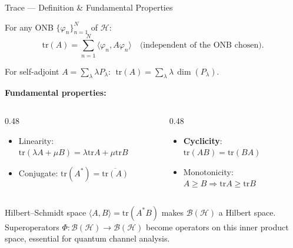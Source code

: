 \documentclass{beamer}
\newcommand{\Hilb}{\mathcal{H}}
\newcommand{\Bound}{\mathcal{B}}
\newcommand{\tr}{\mathrm{tr}}
\newcommand{\ip}[2]{\langle #1, #2 \rangle}
\begin{document}
\begin{frame}[shrink=10]{Trace --- Definition \& Fundamental Properties}
  \small
  \begin{tcolorbox}[defbox, title={Definition}, left=3pt, right=3pt, top=2pt, bottom=2pt]
    For any ONB $\{\varphi_n\}_{n=1}^N$ of $\Hilb$:
    \[
      \tr(A) = \sum_{n=1}^N \ip{\varphi_n}{A\varphi_n}
      \quad \text{(independent of the ONB chosen).}
    \]
  \end{tcolorbox}

  For self-adjoint $A=\sum_\lambda\lambda P_\lambda$:
  $\;\tr(A)=\sum_\lambda\lambda\,\dim(P_\lambda)$.

  \vspace{0.15em}
  \textbf{Fundamental properties:}
  \begin{columns}[T]
    \begin{column}{0.48\textwidth}
      \begin{itemize}\setlength\itemsep{1pt}
        \item Linearity: $\tr(\lambda A+\mu B)=\lambda\tr A+\mu\tr B$
        \item Conjugate: $\tr(A^*)=\overline{\tr(A)}$
      \end{itemize}
    \end{column}
    \begin{column}{0.48\textwidth}
      \begin{itemize}\setlength\itemsep{1pt}
        \item \textbf{Cyclicity}: $\tr(AB)=\tr(BA)$
        \item Monotonicity: $A\ge B\Rightarrow\tr A\ge\tr B$
      \end{itemize}
    \end{column}
  \end{columns}

  \vspace{0.15em}
  \begin{block}{Hilbert--Schmidt space}
  \justifying
    $\ip{A}{B}=\tr(A^*B)$ makes $\Bound(\Hilb)$ a Hilbert space.\\
    Superoperators $\Phi:\Bound(\Hilb)\to\Bound(\Hilb)$ become operators on this inner product space, essential for quantum channel analysis.
  \end{block}
\end{frame}
\end{document}
